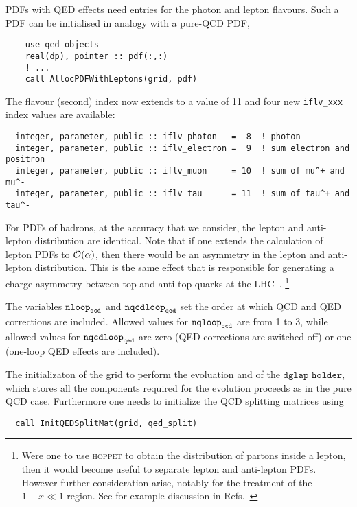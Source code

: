 \documentclass[12pt]{article}
\newcommand{\comment}[1]{\textbf{[#1]}}
\newcommand{\hoppet}{\textsc{hoppet}\xspace}
\newcommand{\ttt}[1]{\texttt{#1}}
\begin{document}
PDFs with QED effects need entries for the photon and lepton flavours.
%
Such a PDF can be initialised in analogy with a pure-QCD PDF,
\begin{lstlisting}
    use qed_objects
    real(dp), pointer :: pdf(:,:)
    ! ...
    call AllocPDFWithLeptons(grid, pdf)
\end{lstlisting}
The flavour (second) index now extends to a value of 11 and four new
\ttt{iflv\_xxx} index values are available:
\begin{lstlisting}
  integer, parameter, public :: iflv_photon   =  8  ! photon 
  integer, parameter, public :: iflv_electron =  9  ! sum electron and positron
  integer, parameter, public :: iflv_muon     = 10  ! sum of mu^+ and mu^-
  integer, parameter, public :: iflv_tau      = 11  ! sum of tau^+ and tau^-
\end{lstlisting}
For PDFs of hadrons, at the accuracy that we consider, the lepton and
anti-lepton distribution are identical. Note that if one extends the
calculation of lepton PDFs to ${\cal O}(\alpha)$, then there would be
an asymmetry in the lepton and anti-lepton distribution. This is the
same effect that is responsible for generating a charge asymmetry
between top and anti-top quarks at the LHC~\cite{Kuhn:1998kw}.
%
%
\footnote{Were one to use \hoppet to obtain the distribution of
  partons inside a lepton, then it would become useful to separate
  lepton and anti-lepton PDFs.
  However further consideration arise, notably for the treatment of
  the $1-x \ll 1$ region.
  See for example discussion in Refs.~\cite{Frixione:2023gmf}
}

The variables ${\tt nloop}_{\tt qcd}$ and ${\tt nqcdloop}_{\tt qed}$
set the order at which QCD and QED corrections are included. Allowed
values for ${\tt nqloop}_{\tt qcd}$ are from 1 to 3, while allowed
values for ${\tt nqcdloop}_{\tt qed}$ are zero (QED corrections are
switched off) or one (one-loop QED effects are included).

The initializaton of the grid to perform the evoluation and of the
$\ttt{dglap\_holder}$, which stores all the components required for the
evolution proceeds as in the pure QCD case. Furthermore one needs to
initialize the QCD splitting matrices using 
\begin{lstlisting}
  call InitQEDSplitMat(grid, qed_split)
\end{lstlisting}
\end{document}
